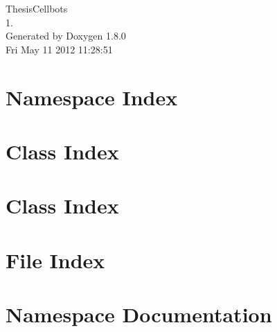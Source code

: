 \documentclass{book}
\begin{document}
\hypersetup{pageanchor=false,citecolor=blue}
\begin{titlepage}
\vspace*{7cm}
\begin{center}
{\Large Thesis\-Cellbots \\[1ex]\large 1. }\\
\vspace*{1cm}
{\large Generated by Doxygen 1.8.0}\\
\vspace*{0.5cm}
{\small Fri May 11 2012 11:28:51}\\
\end{center}
\end{titlepage}
\clearemptydoublepage
{}
\tableofcontents
\clearemptydoublepage
{}
\hypersetup{pageanchor=true,citecolor=blue}
\chapter{Namespace Index}

\chapter{Class Index}

\chapter{Class Index}

\chapter{File Index}

\chapter{Namespace Documentation}























\end{document}
